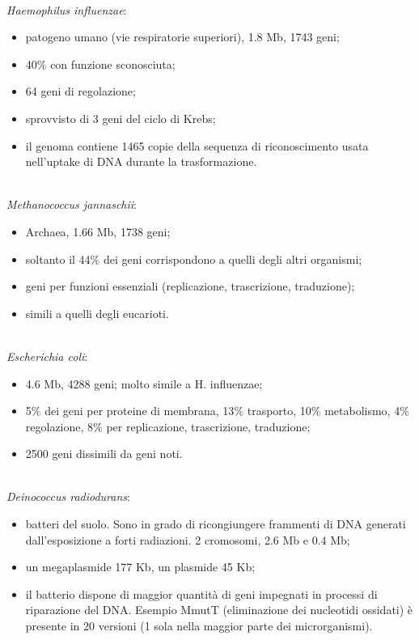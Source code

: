 \\\textit{Haemophilus influenzae}:
\begin{itemize}
    \item patogeno umano (vie respiratorie superiori), 1.8 Mb, 1743 geni;
    \item 40$\%$ con funzione sconosciuta;
    \item 64 geni di regolazione; 
    \item sprovvisto di 3 geni del ciclo di Krebs; 
    \item il genoma contiene 1465 copie della sequenza di riconoscimento usata nell'uptake di DNA durante la trasformazione.
\end{itemize}
\\\textit{Methanococcus jannaschii}: 
\begin{itemize}
    \item Archaea, 1.66 Mb, 1738 geni; 
    \item soltanto il 44$\%$ dei geni corrispondono a quelli degli altri organismi; 
    \item geni per funzioni  essenziali (replicazione, trascrizione, traduzione);
    \item simili a quelli degli eucarioti.
\end{itemize}
\\\textit{Escherichia coli}: 
\begin{itemize}
    \item 4.6 Mb, 4288 geni; molto simile a H. influenzae;
    \item 5$\%$ dei geni per proteine di membrana, 13$\%$ trasporto, 10$\%$ metabolismo, 4$\%$ regolazione, 8$\%$ per replicazione, trascrizione, traduzione;
    \item 2500 geni dissimili da geni noti.
\end{itemize}
\\\textit{Deinococcus radiodurans}:
\begin{itemize}
    \item batteri del suolo. Sono in grado di ricongiungere frammenti di DNA generati dall'esposizione a forti radiazioni. 2 cromosomi, 2.6 Mb e 0.4 Mb;
    \item un megaplasmide 177 Kb, un plasmide 45 Kb;
    \item il batterio dispone di maggior quantit\`a di geni impegnati in processi di riparazione del DNA. Esempio MmutT (eliminazione dei nucleotidi ossidati) \`e presente in 20 versioni (1 sola nella maggior parte dei microrganismi).
\end{itemize}
